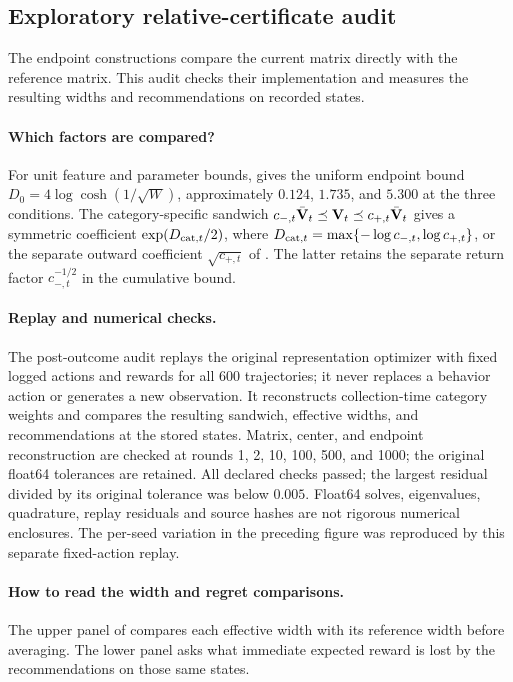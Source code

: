 \subsection{Exploratory relative-certificate audit}

The endpoint constructions compare the current matrix directly with the
reference matrix.  This audit checks their implementation and measures the
resulting widths and recommendations on recorded states.

\paragraph{Which factors are compared?}
For unit feature and parameter bounds,  gives
the uniform endpoint bound $D_0=4\log\cosh(1/\sqrt W)$, approximately
$0.124$, $1.735$, and $5.300$ at the three conditions.  The category-specific
sandwich $c_{-,t}\bar{\mathbf{V}}_t\preceq\mathbf{V}_t\preceq c_{+,t}\bar{\mathbf{V}}_t$ gives a
symmetric coefficient $\exp(D_{{\rm cat},t}/2)$, where
$D_{{\rm cat},t}=\max\{-\log c_{-,t},\log c_{+,t}\}$, or the separate outward
coefficient $\sqrt{c_{+,t}}$ of .
The latter retains the separate return factor $c_{-,t}^{-1/2}$ in the
cumulative bound.

\paragraph{Replay and numerical checks.}
The post-outcome audit replays the original representation optimizer with
fixed logged actions and rewards for all 600 trajectories; it never replaces
a behavior action or generates a new observation.  It reconstructs
collection-time category weights and compares the resulting sandwich,
effective widths, and recommendations at the stored states.  Matrix, center,
and endpoint reconstruction are checked at rounds 1, 2, 10, 100, 500, and 1000;
the original float64 tolerances are retained.  All declared checks
passed; the largest residual divided by its original tolerance was below
$0.005$. Float64 solves, eigenvalues, quadrature, replay residuals and source
hashes are not rigorous numerical enclosures.  The per-seed variation in the preceding figure was reproduced by this
separate fixed-action replay.

\paragraph{How to read the width and regret comparisons.}
The upper panel of  compares each
effective width with its reference width before averaging.  The lower panel
asks what immediate expected reward is lost by the recommendations on those
same states.

